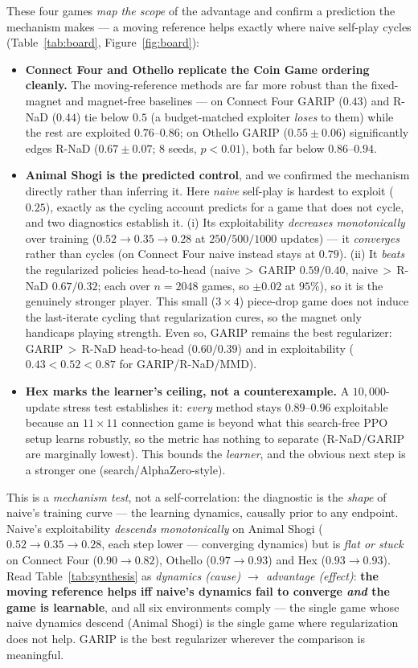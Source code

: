 \documentclass[10pt,twocolumn]{article}
\theoremstyle{plain}
\theoremstyle{remark}
\begin{document}
These four games \emph{map the scope} of the advantage and confirm a prediction the
mechanism makes --- a moving reference helps exactly where naive self-play cycles
(Table~\ref{tab:board}, Figure~\ref{fig:board}):
\begin{itemize}
  \item \textbf{Connect Four and Othello replicate the Coin Game ordering cleanly.}
  The moving-reference methods are far more robust than the fixed-magnet and
  magnet-free baselines --- on Connect Four GARIP ($0.43$) and R-NaD ($0.44$) tie
  below $0.5$ (a budget-matched exploiter \emph{loses} to them) while the rest are
  exploited $0.76$--$0.86$; on Othello GARIP ($0.55\!\pm\!0.06$) significantly edges
  R-NaD ($0.67\!\pm\!0.07$; 8 seeds, $p\!<\!0.01$), both far below $0.86$--$0.94$.
  \item \textbf{Animal Shogi is the predicted control}, and we confirmed the
  mechanism directly rather than inferring it. Here \emph{naive} self-play is
  hardest to exploit ($0.25$), exactly as the cycling account predicts for a game
  that does not cycle, and two diagnostics establish it. (i) Its
  exploitability \emph{decreases monotonically} over training
  ($0.52\!\to\!0.35\!\to\!0.28$ at $250/500/1000$ updates) --- it \emph{converges}
  rather than cycles (on Connect Four naive instead stays at $0.79$). (ii) It
  \emph{beats} the regularized policies head-to-head (naive$\,>\,$GARIP
  $0.59/0.40$, naive$\,>\,$R-NaD $0.67/0.32$; each over $n\!=\!2048$ games, so
  $\pm0.02$ at $95\%$), so it is the genuinely stronger player. This small
  ($3\times4$) piece-drop game does not induce the last-iterate cycling that
  regularization cures, so the magnet only handicaps playing strength. Even so,
  GARIP remains the best regularizer: GARIP$\,>\,$R-NaD head-to-head ($0.60/0.39$)
  and in exploitability ($0.43<0.52<0.87$ for GARIP/R-NaD/MMD).
  \item \textbf{Hex marks the learner's ceiling, not a counterexample.} A
  $10{,}000$-update stress test establishes it: \emph{every} method stays
  $0.89$--$0.96$ exploitable because an $11\times11$ connection game is beyond what
  this search-free PPO setup learns robustly, so the metric has nothing to
  separate (R-NaD/GARIP are marginally lowest). This bounds the \emph{learner}, and
  the obvious next step is a stronger one (search/AlphaZero-style).
\end{itemize}
This is a \emph{mechanism test}, not a self-correlation: the diagnostic is the
\emph{shape} of naive's training curve --- the learning dynamics, causally prior to
any endpoint. Naive's exploitability \emph{descends monotonically} on Animal Shogi
($0.52\!\to\!0.35\!\to\!0.28$, each step lower --- converging dynamics) but is
\emph{flat or stuck} on Connect Four ($0.90\!\to\!0.82$), Othello
($0.97\!\to\!0.93$) and Hex ($0.93\!\to\!0.93$). Read Table~\ref{tab:synthesis} as
\emph{dynamics (cause) $\to$ advantage (effect)}: \textbf{the moving reference helps
iff naive's dynamics fail to converge \emph{and} the game is learnable}, and all six
environments comply --- the single game whose naive dynamics descend (Animal Shogi)
is the single game where regularization does not help. GARIP is the best regularizer
wherever the comparison is meaningful.
\end{document}
